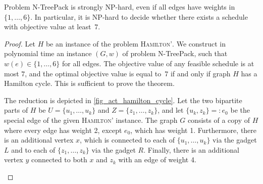 \documentclass[runningheads]{llncs}
\newcommand{\set}[1]{\{ #1 \}}
\newcommand{\fromto}[2]{\set{#1, \ldots, #2}}
\newcommand{\xxxNTP}{{\sc N-TreePack}}
\begin{document}
\begin{theorem}
\label{th:small-weights}
Problem {\xxxNTP} is strongly NP-hard, even if all edges have weights in $\fromto{1}{6}$.
In particular, it is NP-hard to decide whether there exists a schedule with objective value at least~$7$.
\end{theorem}
\begin{proof}
Let $H$ be an instance of the problem \textsc{Hamilton'}. 
We construct in polynomial time an instance $(G,w)$ of problem {\xxxNTP}, such that $w(e)\in\fromto{1}{6}$ 
for all edges. 
The objective value of any feasible schedule is at most $7$, and the optimal objective value is equal to~$7$ 
if and only if graph $H$ has a Hamilton cycle. This is sufficient to prove the theorem.

The reduction is depicted in \cref{fig_act_hamilton_cycle}. Let the two bipartite parts of $H$ be $U = \fromto{u_1}{u_k}$ and $Z = \fromto{z_1}{z_k}$, and let $\set{u_k, z_k} =: e_0$ be the special edge of the given \textsc{Hamilton'} instance. The graph $G$ consists of a copy of $H$ where every edge has weight 2, except $e_0$, which has weight 1. Furthermore, there is an additional vertex $x$, which is connected to each of $\fromto{u_1}{u_k}$ via the gadget $L$ and to each of $\fromto{z_1}{z_k}$ via the gadget $R$. Finally, there is an additional vertex $y$ connected to both $x$ and $z_k$ with an edge of weight 4.
\begin{figure}[htpb]
     \centering
     \begin{subfigure}[b]{0.40\textwidth}
         \centering

\end{subfigure}
\end{figure}
\end{proof}
\end{document}
